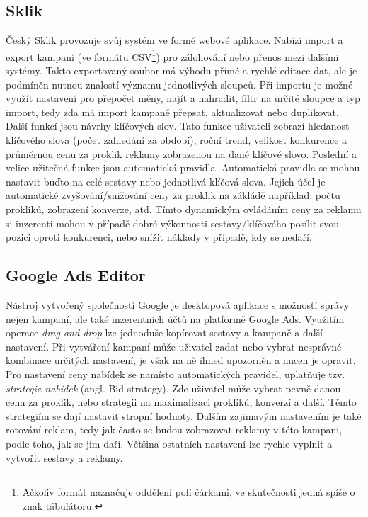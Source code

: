 \subsection{Sklik}
Český Sklik provozuje svůj systém ve formě webové aplikace. Nabízí import a export kampaní 
(ve formátu CSV\footnote{Ačkoliv formát naznačuje oddělení polí čárkami, ve skutečnosti jedná spíše o znak tábulátoru.})
pro zálohování nebo přenos mezi dalšími systémy. Takto exportovaný soubor má výhodu přímé a rychlé editace dat, ale je podmíněn nutnou znalostí významu jednotlivých
sloupců. Při importu je možné využít nastavení pro přepočet měny, najít a nahradit, filtr na určité sloupce a typ import, tedy zda má import kampaně přepsat, aktualizovat
nebo duplikovat.
Další funkcí jsou návrhy klíčových slov. Tato funkce uživateli zobrazí hledanost klíčového slova (počet zahledání za období), roční trend, velikost konkurence a průměrnou
cenu za proklik reklamy zobrazenou na dané klíčové slovo. Poslední a velice užitečná funkce jsou automatická pravidla. Automatická pravidla se mohou nastavit buďto na
celé sestavy nebo jednotlivá klíčová slova. Jejich účel je automatické zvyšování/snižování ceny za proklik na zákládě například: počtu prokliků, zobrazení konverze, atd.
Tímto dynamickým ovládáním ceny za reklamu si inzerenti mohou v případě dobré výkonnosti sestavy/klíčového posílit svou pozici oproti konkurenci, nebo snížit náklady
v případě, kdy se nedaří.


\subsection{Google Ads Editor}
Nástroj vytvořený společností Google je desktopová aplikace s možností správy nejen kampaní, ale také inzerentních účtů na platformě Google Ads. Využitím operace
\emph{drag and drop} lze jednoduše kopírovat sestavy a kampaně a další nastavení. Při vytváření kampaní může uživatel zadat nebo vybrat nesprávné kombinace určitých
nastavení, je však na ně ihned upozorněn a nucen je opravit. Pro nastavení ceny nabídek se namísto automatických pravidel,
uplatňuje tzv. \emph{strategie nabídek} (angl. Bid strategy). Zde uživatel může vybrat pevně danou cenu za proklik, nebo strategii na maximalizaci prokliků, konverzí
a další. Těmto strategiím se dají nastavit stropní hodnoty. Dalším zajimavým nastavením je také rotování reklam, tedy jak často se budou zobrazovat reklamy v této
kampani, podle toho, jak se jim daří. Většina ostatních nastavení lze rychle vyplnit a vytvořit sestavy a reklamy.


